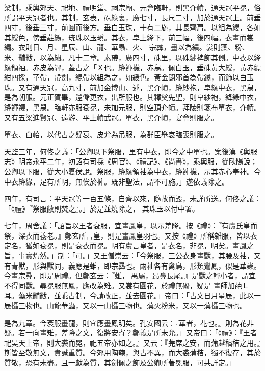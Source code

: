 
\begin{pinyinscope}

 梁制，乘輿郊天、祀地、禮明堂、祠宗廟、元會臨軒，則黑介幘，通天冠平冕，俗所謂平天冠者也。其制，玄表，硃綠裏，廣七寸，長尺二寸，加於通天冠上。前垂四寸，後垂三寸，前圓而後方。垂白玉珠，十有二旒，其長齊肩。以組為纓，各如其綬色，傍垂黈纊，珫珠以玉瑱。其衣，皁上絳下，前三幅，後四幅。衣畫而裳繡。衣則日、月、星辰、山、龍、華蟲、火、
 宗彞，畫以為繢。裳則藻、粉、米、黼黻，以為繡。凡十二章。素帶，廣四寸，硃里，以硃繡裨飾其側。中衣以絳緣領袖。赤皮為韠，蓋古之「Ｘ也。絳褲襪，赤舄。佩白玉，垂硃黃大綬，黃赤縹紺四採，革帶，帶劍，緄帶以組為之，如綬色。黃金闢邪首為帶鐍，而飾以白玉珠。又有通天冠，高九寸，前加金博山、述，黑介幘，絳紗袍，皁緣中衣，黑舄，是為朝服。元正賀畢，還儲更衣，出所服也。其釋奠先聖，則皁紗袍，絳緣中衣，絳褲襪，黑舄。臨軒亦服袞冕，未加元服，則空頂介幘。拜陵則箋布單衣，介幘。又有五梁進賢冠、遠游、平上幘武冠。單衣，黑介幘，宴會則服之。



 單衣、白帢，以代古之疑衰、皮弁為吊服，為群臣舉哀臨喪則服之。



 天監三年，何佟之議：「公卿以下祭服，里有中衣，即今之中單也。案後漢《輿服志》明帝永平二年，初詔有司採《周官》、《禮記》、《尚書》，乘輿服，從歐陽說；公卿以下服，從大小夏侯說。祭服，絳緣領袖為中衣，絳褲襪，示其赤心奉神。今中衣絳緣，足有所明，無俟於褲。既非聖法，謂不可施。」遂依議除之。



 四年，有司言：平天冠等一百五條，自齊以來，隨故而毀，未詳所送。何佟之議：「《禮》『祭服敝則焚之』。」於是並燒除之，
 其珠玉以付中署。



 七年，周舍議：「詔旨以王者袞服，宜畫鳳皇，以示差降。按《禮》：『有虞氏皇而祭，深衣而養老。』鄭玄所言皇，則是畫鳳皇羽也。又按《禮》所稱雜服，皆以衣定名，猶如袞冕，則是袞衣而冕。明有虞言皇者，是衣名，非冕，明矣。畫鳳之旨，事實灼然。」制：「可。」又王僧崇云：「今祭服，三公衣身畫獸，其腰及袖，又有青獸，形與獸同，義應是蜼，即宗彞也。兩袖各有禽鳥，形類鸞鳳，似是華蟲。今畫宗彞，即是周禮。但鄭玄云：『蜼，禺屬，昂鼻長尾。』是獸之輕小者，謂宜不得同獸。尋冕服無鳳，應改為雉。又裳有圓花，於禮無礙，疑是
 畫師加葩Ｌ耳。藻米黼黻，並乖古制，今請改正，並去圓花。」帝曰：「古文日月星辰，此以一辰攝三物也。山龍華蟲，又以一山攝三物也。藻火粉米，又以一藻攝三物也。



 是為九章。今袞服畫龍，則宜應畫鳳明矣。孔安國云：『華者，花也。』則為花非疑。若一向畫雉，差降之文，復將安寄？鄭義是所未允。」又帝曰：「《禮》：『王者祀昊天上帝，則大裘而冕，祀五帝亦如之。』又云：『莞席之安，而蒲越稿秸之用。』斯皆至敬無文，貴誠重質。今郊用陶匏，與古不異，而大裘蒲秸，獨不復存，其於質敬，恐有未盡。且一獻為質，其劍佩之飾及公卿所著冕服，可共詳定。」




\end{pinyinscope}
